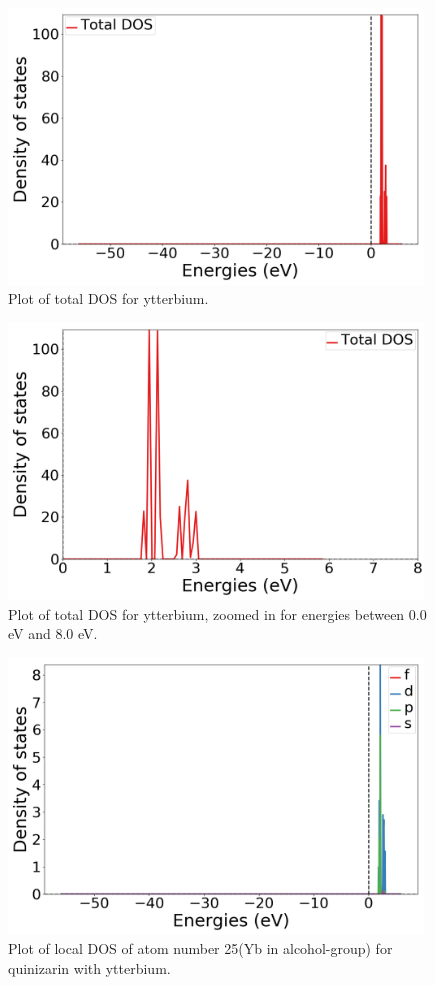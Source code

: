 \documentclass{article}
\begin{document}
  \begin{figure}[H]
      \centering
      \includegraphics[width = 11cm]{../fig/Yb_k4_TDOS_1.png}
      \caption{Plot of total DOS for ytterbium. }
      \label{fig:Yb_k4_TDOS_1.png}
  \end{figure}

  \begin{figure}[H]
      \centering
      \includegraphics[width = 11cm]{../fig/Yb_k4_TDOS_2.png}
      \caption{Plot of total DOS for ytterbium, zoomed in for energies between 0.0 eV and 8.0 eV. }
      \label{fig:Yb_k4_TDOS_2.png}
  \end{figure}

  \begin{figure}[H]
      \centering
      \includegraphics[width = 11cm]{../fig/Yb_k4_LDOS25_1.png}
      \caption{Plot of local DOS of atom number 25(Yb in alcohol-group) for quinizarin with ytterbium. }
      \label{fig:Yb_k4_LDOS25_1.png}
  \end{figure}
\end{document}

